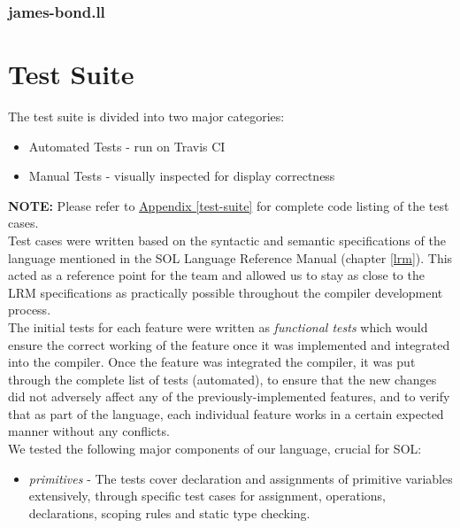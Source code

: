 \documentclass[letterpaper,12pt]{report}
\begin{document}
{    \subsubsection{james-bond.ll}
        

  \section{Test Suite}
    The test suite is divided into two major categories:
    \begin{itemize}
      \itemsep 0em
      \item Automated Tests - run on Travis CI
      \item Manual Tests - visually inspected for display correctness
    \end{itemize}

    \textbf{NOTE:} Please refer to \underline{Appendix \ref{test-suite}} for complete code listing of the test cases.\\

    Test cases were written based on the syntactic and semantic specifications of the language mentioned in the SOL Language Reference Manual (chapter \ref{lrm}). This acted as a reference point for the team and allowed us to stay as close to the LRM specifications as practically possible throughout the compiler development process.\\

    The initial tests for each feature were written as \textit{functional tests} which would ensure the correct working of the feature once it was implemented and integrated into the compiler. Once the feature was integrated  the compiler, it was put through the complete list of tests (automated), to ensure that the new changes did not adversely affect any of the previously-implemented features, and to verify that as part of the language, each individual feature works in a certain expected manner without any conflicts.\\

    We tested the following major components of our language, crucial for SOL:
    \begin{itemize}
      \itemsep 0em
      \item \textit{primitives} - The tests cover declaration and assignments of primitive variables extensively, through specific test cases for assignment, operations, declarations, scoping rules and static type checking.


\end{itemize}}
\end{document}
